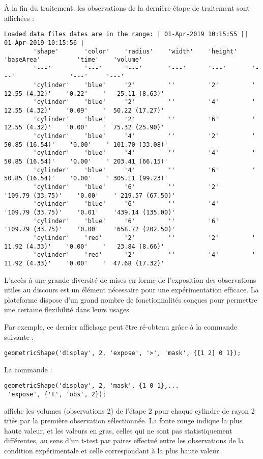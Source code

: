 \`A la fin du traitement, les observations de la dernière étape de traitement sont affichées :
\begin{Verbatim}[fontsize=\scriptsize]
	Loaded data files dates are in the range: | 01-Apr-2019 10:15:55 || 01-Apr-2019 10:15:56 |
	    'shape'       'color'    'radius'    'width'    'height'    'baseArea'          'time'    'volume'
	    '---'         '---'      '---'       '---'      '---'       '---'               '---'     '---'
	    'cylinder'    'blue'     '2'         ''         '2'         '  12.55 (4.32)'    '0.22'    '   25.11 (8.63)'
	    'cylinder'    'blue'     '2'         ''         '4'         '  12.55 (4.32)'    '0.09'    '  50.22 (17.27)'
	    'cylinder'    'blue'     '2'         ''         '6'         '  12.55 (4.32)'    '0.00'    '  75.32 (25.90)'
	    'cylinder'    'blue'     '4'         ''         '2'         ' 50.85 (16.54)'    '0.00'    ' 101.70 (33.08)'
	    'cylinder'    'blue'     '4'         ''         '4'         ' 50.85 (16.54)'    '0.00'    ' 203.41 (66.15)'
	    'cylinder'    'blue'     '4'         ''         '6'         ' 50.85 (16.54)'    '0.00'    ' 305.11 (99.23)'
	    'cylinder'    'blue'     '6'         ''         '2'         '109.79 (33.75)'    '0.00'    ' 219.57 (67.50)'
	    'cylinder'    'blue'     '6'         ''         '4'         '109.79 (33.75)'    '0.01'    '439.14 (135.00)'
	    'cylinder'    'blue'     '6'         ''         '6'         '109.79 (33.75)'    '0.00'    '658.72 (202.50)'
	    'cylinder'    'red'      '2'         ''         '2'         '  11.92 (4.33)'    '0.00'    '   23.84 (8.66)'
	    'cylinder'    'red'      '2'         ''         '4'         '  11.92 (4.33)'    '0.00'    '  47.68 (17.32)'
\end{Verbatim}

L'accès à une grande diversité de mises en forme de l'exposition des observations utiles au discours est un élément nécessaire pour une expérimentation efficace. La plateforme \explanes dispose d'un grand nombre de fonctionnalités conçues pour permettre une certaine flexibilité dans leurs usages.

Par exemple, ce dernier affichage peut être ré-obtenu grâce à la commande suivante :
\begin{lstlisting}
geometricShape('display', 2, 'expose', '>', 'mask', {[1 2] 0 1});
\end{lstlisting}
La commande :
\begin{lstlisting}
geometricShape('display', 2, 'mask', {1 0 1},...
 'expose', {'t', 'obs', 2});
\end{lstlisting}
affiche les volumes (observations 2) de l'étape 2 pour chaque cylindre de rayon 2 triés par la première observation sélectionnée. La fonte rouge indique la plus haute valeur, et les valeurs en gras, celles qui ne sont pas statistiquement différentes, au sens d'un t-test par paires effectué entre les observations de la condition expérimentale et celle correspondant à la plus haute valeur.

